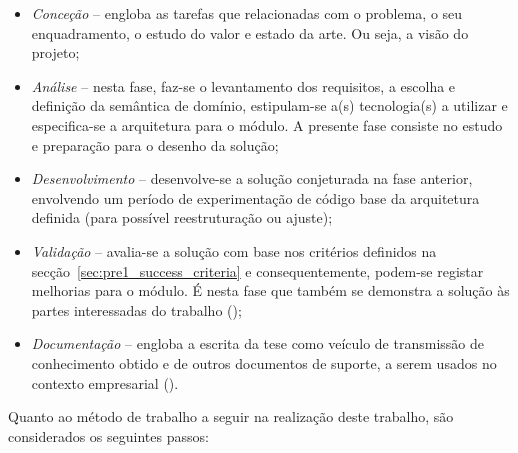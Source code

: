 \begin{itemize}
    \item 
    {
        \textit{Conceção} -- engloba as tarefas que relacionadas com o problema, o seu enquadramento, o estudo do valor e estado da arte. Ou seja, a visão do projeto;
    }
    \item
    {
        \textit{Análise} -- nesta fase, faz-se o levantamento dos requisitos, a escolha e definição da semântica de domínio, estipulam-se a(s) tecnologia(s) a utilizar e especifica-se a arquitetura para o módulo. A presente fase consiste no estudo e preparação para o desenho da solução; 
    }
    \item
    {
        \textit{Desenvolvimento} -- desenvolve-se a solução conjeturada na fase anterior, envolvendo um período de experimentação de código base da arquitetura definida (para possível reestruturação ou ajuste);
    }
    \item
    {
        \textit{Validação} -- avalia-se a solução com base nos critérios definidos na secção~\ref{sec:pre1_success_criteria} e consequentemente, podem-se registar melhorias para o módulo. É nesta fase que também se demonstra a solução às partes interessadas do trabalho ();
    }
    \item
    {
        \textit{Documentação} -- engloba a escrita da tese como veículo de transmissão de conhecimento obtido e de outros documentos de suporte, a serem usados no contexto empresarial ().
    }
\end{itemize}

Quanto ao método de trabalho a seguir na realização deste trabalho, são considerados os seguintes passos:

